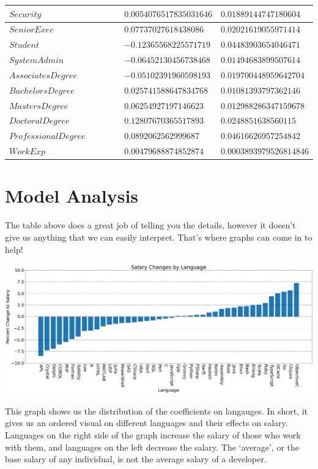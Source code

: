 \documentclass{report}
\begin{document}
\begin{longtable}{|R{0.4\linewidth}|R{0.3\linewidth}|R{0.3\linewidth}|}
  \hline
  $Security$ & $0.0054076517835031646$ & $0.01889144747180604$\\
  \hline
  $SeniorExec$ & $0.07737027618438086$ & $0.02021619055971414$\\
  \hline
  $Student$ & $-0.12365568225571719$ & $0.04483903654046471$\\
  \hline
  $SystemAdmin$ & $-0.06452130456738468$ & $0.01494683899507614$\\
  \hline
  $AssociatesDegree$ & $-0.05102391960598193$ & $0.019700448959642704$\\
  \hline
  $BachelorsDegree$ & $0.025741588647834768$ & $0.01081393797362146$\\
  \hline
  $MastersDegree$ & $0.06254927197146623$ & $0.012988286347159678$\\
  \hline
  $DoctoralDegree$ & $0.12807670365517893$ & $0.0248851638560115$\\
  \hline
  $ProfessionalDegree$ & $0.0892062562999687$ & $0.04616626957254842$\\
  \hline
  $WorkExp$ & $0.00479688874852874$ & $0.0003893979526814846$ \\
  \hline
\end{longtable}

\newpage
\section{Model Analysis}
The table above does a great job of telling you the details, however it doesn't give us anything that we can easily interpret. That's where graphs can come in to help!

\vspace{0.5in}

\includegraphics[width=0.95\linewidth]{coefficients_language.png}

\vspace{0.5in}

This graph shows us the distribution of the coefficients on langauges. In short, it gives us an ordered visual on different languages and their effects on salary. Languages on the right side of the graph increase the salary of those who work with them, and languages on the left decrease the salary. The `average', or the base salary of any individual, is not the average salary of a developer.
\end{document}
